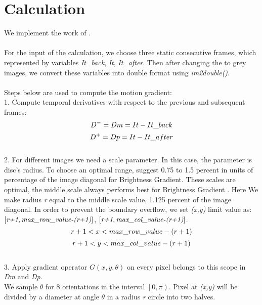 \documentclass[12pt]{article}
\begin{document}
\section{Calculation}
\label{secIntro}
We implement the work of \cite{1}.\\\\
For the input of the calculation, we choose three static consecutive frames, which represented by variables \emph{It\_back}, \emph{It}, \emph{It\_after}.
Then after changing the to grey images, we convert these variables into double format using \emph{im2double()}.\\\\
Steps below are used to compute the motion gradient:
\\
1. Compute temporal derivatives with respect to the previous and subsequent frames:
\begin{equation}
D^-=Dm=It-It\_back\\
\end{equation}
\begin{equation}
D^+=Dp=It-It\_after\\
\end{equation}
\\
2. For different images we need a scale parameter. In this case, the parameter is disc's radius. To choose an optimal range,  \cite{3} suggest 0.75 to 1.5 percent in units of percentage of the image diagonal for Brightness Gradient. These scales are optimal, the middle scale always performs best for Brightness Gradient \cite{3}. Here We make radius \emph{r} equal to the middle scale value, 1.125 percent of the image diagonal. In order to prevent the boundary overflow, we set \emph{(x,y)} limit value as: $\left [ \emph{r+1}, \emph{max\_row\_value-(r+1)} \right ]$, $\left [ \emph{r+1}, \emph{max\_col\_value-(r+1)} \right]$.
\begin{equation}
r+1 < x < max\_row\_value - (r+1)\\
\end{equation}
\begin{equation}
r+1 < y < max\_col\_value - (r+1)\\
\end{equation}
\\
3. Apply gradient operator \emph{$G(x,y,\theta)$} on every pixel belongs to this scope in \emph{Dm} and \emph{Dp}.\\
We sample $\theta$ for 8 orientations in the interval $\left [ 0,\pi \right )$. 
Pixel at \emph{(x,y)} will be divided by a diameter at angle $\theta$ in a radius \emph{r} circle into two halves.
\end{document}
